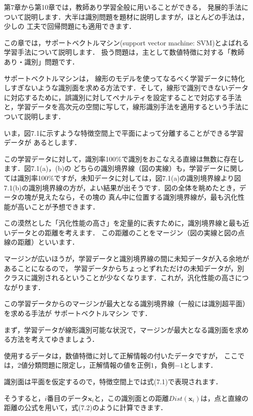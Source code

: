 
第7章から第10章では，教師あり学習全般に用いることができる，
発展的手法について説明します．大半は識別問題を題材に説明しますが，ほとんどの手法は，少しの
工夫で回帰問題にも適用できます．

この章では，サポートベクトルマシン(support vector machine: SVM)とよばれる学習手法について説明します．
扱う問題は，主として数値特徴に対する「教師あり・識別」問題です．

サポートベクトルマシンは，
線形のモデルを使ってなるべく学習データに特化しすぎないような識別面を求める方法です．そして，線形で識別できないデータに対応するために，誤識別に対してペナルティを設定することで対応する手法と，学習データを高次元の空間に写して，線形識別手法を適用するという手法について説明します．

いま，図7.1に示すような特徴空間上で平面によって分離することができる学習データが
あるとします．

この学習データに対して，識別率100\%で識別をおこなえる直線は無数に存在します．図7.1(a)，(b)の
どちらの識別境界線（図の実線）も，学習データに関しては識別率100\%ですが，未知データに対しては，図7.1(a)の識別境界線より図7.1(b)の識別境界線の方が，よい結果が出そうです．図の全体を眺めたとき，データの塊が見えたなら，その塊の
真ん中に位置する識別境界線が，最も汎化性能が高いことが予想できます．

この漠然とした「汎化性能の高さ」を定量的に表すために，識別境界線と最も近いデータとの距離を考えます．
この距離のことをマージン（図の実線と図の点線の距離）といいます．

マージンが広いほうが，学習データと識別境界線の間に未知データが入る余地があることになるので，
学習データからちょっとずれただけの未知データが，別クラスに識別されるということが少なくなります．これが，汎化性能の高さにつながります．

この学習データからのマージンが最大となる識別境界線（一般には識別超平面）を求める手法が
サポートベクトルマシン
です．


まず，学習データが線形識別可能な状況で，マージンが最大となる識別面を求める方法を考えてゆきましょう．

使用するデータは，数値特徴に対して正解情報の付いたデータですが，
ここでは，2値分類問題に限定し，正解情報の値を正例$1$，負例$-1$とします．

識別面は平面を仮定するので，特徴空間上では式(7.1)で表現されます．

そうすると，$i$番目のデータ$\bm{x}_i$と，この識別面との距離$Dist({\bm{x}_i})$は，点と直線の距離の公式を用いて，式(7.2)のように計算できます．

